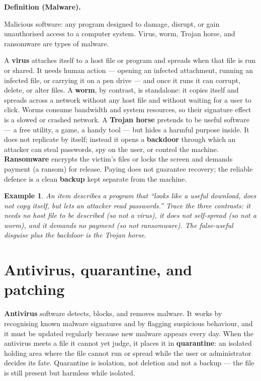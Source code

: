\documentclass[11pt]{article}
\newtheorem{example}{Example}[section]
\newenvironment{definitionbox}[1]{%
  \par\noindent\textbf{Definition (#1).}\ \itshape
}{\par\vspace{0.3em}}
\begin{document}
\begin{definitionbox}{Malware}
Malicious software: any program designed to damage, disrupt, or gain
unauthorised access to a computer system. Virus, worm, Trojan horse, and
ransomware are types of malware.
\end{definitionbox}

A \textbf{virus} attaches itself to a host file or program and spreads when
that file is run or shared. It needs human action --- opening an infected
attachment, running an infected file, or carrying it on a pen drive --- and
once it runs it can corrupt, delete, or alter files. A \textbf{worm}, by
contrast, is standalone: it copies itself and spreads across a network
without any host file and without waiting for a user to click. Worms
consume bandwidth and system resources, so their signature effect is a
slowed or crashed network. A \textbf{Trojan horse} pretends to be useful
software --- a free utility, a game, a handy tool --- but hides a harmful
purpose inside. It does not replicate by itself; instead it opens a
\textbf{backdoor} through which an attacker can steal passwords, spy on the
user, or control the machine. \textbf{Ransomware} encrypts the victim's
files or locks the screen and demands payment (a ransom) for release.
Paying does not guarantee recovery; the reliable defence is a clean
\textbf{backup} kept separate from the machine.

\begin{example}
An item describes a program that ``looks like a useful download, does not
copy itself, but lets an attacker read passwords.'' Trace the three
contrasts: it needs no host file to be described (so not a virus), it does
not self-spread (so not a worm), and it demands no payment (so not
ransomware). The false-useful disguise plus the backdoor is the Trojan
horse.
\end{example}

\section{Antivirus, quarantine, and patching}
\textbf{Antivirus} software detects, blocks, and removes malware. It works
by recognising known malware signatures and by flagging suspicious
behaviour, and it must be updated regularly because new malware appears
every day. When the antivirus meets a file it cannot yet judge, it places
it in \textbf{quarantine}: an isolated holding area where the file cannot
run or spread while the user or administrator decides its fate. Quarantine
is isolation, not deletion and not a backup --- the file is still present
but harmless while isolated.
\end{document}
